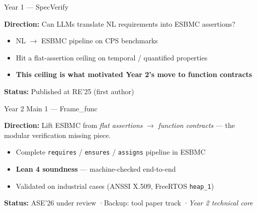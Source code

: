 \documentclass[aspectratio=169]{beamer}
\begin{document}
\begin{frame}{Year 1 --- SpecVerify}

\textbf{Direction:} Can LLMs translate NL requirements into ESBMC assertions?

\bigskip
\begin{itemize}
  \item NL $\rightarrow$ ESBMC pipeline on CPS benchmarks
  \item Hit a \textcolor{myred}{flat-assertion ceiling} on temporal / quantified properties
  \item \textbf{This ceiling is what motivated Year 2's move to function contracts}
\end{itemize}

\bigskip
\textbf{Status:} \textcolor{mygreen}{Published at RE'25} (first author)

\end{frame}

\begin{frame}{Year 2 Main 1 --- Frame\_func}

\textbf{Direction:} Lift ESBMC from \emph{flat assertions} $\rightarrow$ \emph{function contracts} ---
the modular verification missing piece.

\bigskip
\begin{itemize}
  \item Complete \texttt{requires} / \texttt{ensures} / \texttt{assigns} pipeline in ESBMC
  \item \textcolor{mygreen}{\textbf{Lean 4 soundness}} --- machine-checked end-to-end
  \item Validated on industrial cases (ANSSI X.509, FreeRTOS \texttt{heap\_1})
\end{itemize}

\bigskip
\textbf{Status:} \textcolor{myorange}{ASE'26 under review}
\quad·\quad Backup: tool paper track
\quad·\quad \emph{Year 2 technical core}

\end{frame}
\end{document}
